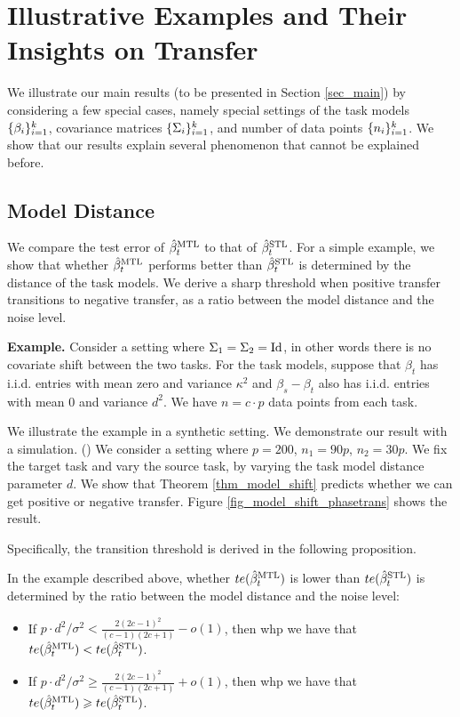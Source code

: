 \section{Illustrative Examples and Their Insights on Transfer}\label{sec_insight}

We illustrate our main results (to be presented in Section \ref{sec_main}) by considering a few special cases, namely special settings of the task models $\{\beta_i\}_{i=1}^k$, covariance matrices $\{\Sigma_i\}_{i=1}^k$, and number of data points $\{n_i\}_{i=1}^k$.
We show that our results explain several phenomenon that cannot be explained before.

\subsection{Model Distance}

We compare the test error of $\hat{\beta}_t^{\text{MTL}}$ to that of $\hat{\beta}_t^{\text{STL}}$.
For a simple example, we show that whether $\hat{\beta}_t^{\text{MTL}}$ performs better than $\hat{\beta}_t^{\text{STL}}$ is determined by the distance of the task models.
We derive a sharp threshold when positive transfer transitions to negative transfer, as a ratio between the model distance and the noise level.

\textbf{Example.}
	Consider a setting where $\Sigma_1 = \Sigma_2 = \operatorname{Id}$, in other words there is no covariate shift between the two tasks.
	For the task models, suppose that $\beta_t$ has i.i.d. entries with mean zero and variance $\kappa^2$ and $\beta_s - \beta_t$ also has i.i.d. entries with mean $0$ and variance $d^2$.
	We have $n = c \cdot p$ data points from each task.

	We illustrate the example in a synthetic setting.
	We demonstrate our result with a simulation. ()
	We consider a setting where $p = 200$, $n_1 = 90p$, $n_2 = 30p$.
	We fix the target task and vary the source task, by varying the task model distance parameter $d$.
	We show that Theorem \ref{thm_model_shift} predicts whether we can get positive or negative transfer.
	Figure \ref{fig_model_shift_phasetrans} shows the result.

Specifically, the transition threshold is derived in the following proposition.
\begin{proposition}\label{prop_transition}
	In the example described above, whether $te(\hat{\beta}_t^{\text{MTL}})$ is lower than $te(\hat{\beta}_t^{\text{STL}})$ is determined by the ratio between the model distance and the noise level:
	\begin{itemize}
		\item If ${p\cdot d^2}/{\sigma^2} < \frac{2(2c-1)^2}{(c-1)(2c+1)} - o(1)$, then whp we have that $te(\hat{\beta}_t^{\text{MTL}}) < te(\hat{\beta}_t^{\text{STL}})$.
		\item If ${p\cdot d^2}/{\sigma^2} \ge \frac{2(2c-1)^2}{(c-1)(2c+1)} + o(1)$, then whp we have that $te(\hat{\beta}_t^{\text{MTL}}) \geqslant te(\hat{\beta}_t^{\text{STL}})$.
	\end{itemize}
\end{proposition}

